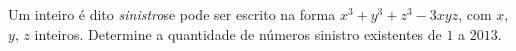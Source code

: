 Um inteiro é dito \emph{sinistro}se pode ser escrito na forma $x^3 + y^3 + z^3 - 3xyz$, com $x$, $y$, $z$ inteiros.
Determine a quantidade de números sinistro existentes de $1$ a $2013$.
